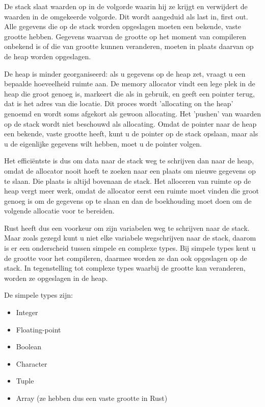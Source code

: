 De stack slaat waarden op in de volgorde waarin hij ze krijgt en verwijdert de waarden in de
omgekeerde volgorde. Dit wordt aangeduid als last in, first out. Alle gegevens die op de stack
worden opgeslagen moeten een bekende, vaste grootte hebben. Gegevens waarvan de grootte op het
moment van compileren onbekend is of die van grootte kunnen veranderen, moeten in plaats daarvan op
de heap worden opgeslagen. 

De heap is minder georganiseerd: als u gegevens op de heap zet, vraagt u een bepaalde hoeveelheid
ruimte aan. De memory allocator vindt een lege plek in de heap die groot genoeg is, markeert die als
in gebruik, en geeft een pointer terug, dat is het adres van die locatie. Dit proces wordt
'allocating on the heap' genoemd en wordt soms afgekort als gewoon allocating. Het 'pushen' van
waarden op de stack wordt niet beschouwd als allocating. Omdat de pointer naar de heap een bekende,
vaste grootte heeft, kunt u de pointer op de stack opslaan, maar als u de eigenlijke gegevens wilt
hebben, moet u de pointer volgen. 

Het efficiëntste is dus om data naar de stack weg te schrijven dan naar de heap, omdat de allocator
nooit hoeft te zoeken naar een plaats om nieuwe gegevens op te slaan. Die plaats is altijd bovenaan
de stack. Het alloceren van ruimte op de heap vergt meer werk, omdat de allocator eerst een ruimte
moet vinden die groot genoeg is om de gegevens op te slaan en dan de boekhouding moet doen om de
volgende allocatie voor te bereiden. 

Rust heeft dus een voorkeur om zijn variabelen weg te schrijven naar de stack. Maar zoals gezegd
kunt u niet elke variabele wegschrijven naar de stack, daarom is er een onderscheid tussen simpele en
complexe types. Bij simpele types kent u de grootte voor het compileren, daarmee worden ze dan ook
opgeslagen op de stack. In tegenstelling tot complexe types waarbij de grootte kan veranderen,
worden ze opgeslagen in de heap.

De simpele types zijn:
\begin{itemize}
  \item Integer
  \item Floating-point
  \item Boolean
  \item Character
  \item Tuple
  \item Array (ze hebben dus een vaste grootte in Rust)
\end{itemize}


